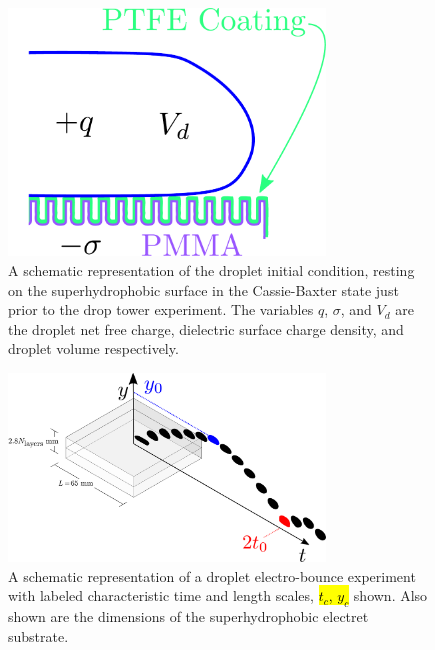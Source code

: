 \documentclass[12pt,a4paper,oneside]{book}
\begin{document}
\begin{figure}[ht]
 \centering
 \includegraphics[width=0.75\textwidth]{../figures/schematic.pdf}
 \caption{A schematic representation of the droplet initial condition, resting on the superhydrophobic surface in the Cassie-Baxter state just prior to the drop tower experiment. The variables $q$, $\sigma$, and $V_d$ are the droplet net free charge, dielectric surface charge density, and droplet volume respectively.\label{fig:schematic}}
\end{figure}
\begin{figure}[ht]
 \centering
 \includegraphics[width=0.75\textwidth]{../figures/apparatus0.pdf}
 \caption{A schematic representation of a droplet electro-bounce experiment with labeled characteristic time and length scales, \hl{$t_c$, $y_c$} shown. Also shown are the dimensions of the superhydrophobic electret substrate.\label{fig:apparatus0}}
\end{figure}
\end{document}
